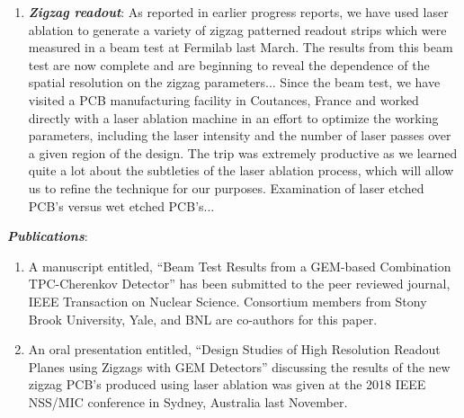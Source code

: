 \begin{enumerate}
\item	\textbf{\emph{Zigzag readout}}: As reported in earlier progress reports, we have used laser ablation to generate a variety of zigzag patterned readout strips which were measured in a beam test at Fermilab last March. The results from this beam test are now complete and are beginning to reveal the dependence of the spatial resolution on the zigzag parameters... 
Since the beam test, we have visited a PCB manufacturing facility in Coutances, France and worked directly with a laser ablation machine in an effort to optimize the working parameters, including the laser intensity and the number of laser passes over a given region of the design. The trip was extremely productive as we learned quite a lot about the subtleties of the laser ablation process, which will allow us to refine the technique for our purposes.
Examination of laser etched PCB's versus wet etched PCB's...

\end{enumerate}


\textbf{\emph{Publications}}:
\begin{enumerate}

\item A manuscript entitled, “Beam Test Results from a GEM-based Combination TPC-Cherenkov Detector” has been submitted to the peer reviewed journal, IEEE Transaction on Nuclear Science. Consortium members from Stony Brook University, Yale, and BNL are co-authors for this paper.


\item An oral presentation entitled, “Design Studies of High Resolution Readout Planes using Zigzags with GEM Detectors” discussing the results of the new zigzag PCB’s produced using laser ablation was given at the 2018 IEEE NSS/MIC conference in Sydney, Australia last November. 

\end{enumerate}


